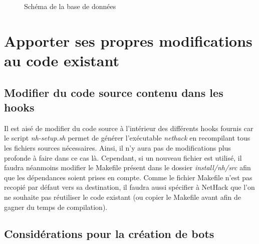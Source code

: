 \documentclass[10pt,a4paper]{report}
\begin{document}
\begin{figure}[H]
	\caption{\label{fig:database} Schéma de la base de données}
\end{figure}

\chapter{Apporter ses propres modifications au code existant}
\section{Modifier du code source contenu dans les hooks}
Il est aisé de modifier du code source à l'intérieur des différents hooks
fournis car le script \emph{nh-setup.sh} permet de générer l'exécutable
\emph{nethack} en recompilant tous les fichiers sources nécessaires. Ainsi, il n'y aura
pas de modifications plus profonde à faire dans ce cas là. Cependant, si un
nouveau fichier est utilisé, il faudra néanmoins modifier le Makefile présent
dans le dossier \emph{install/nh/src} afin que les dépendances soient prises en
compte. Comme le fichier Makefile n'est pas recopié par défaut vers sa
destination, il faudra aussi spécifier à NetHack que l'on ne souhaite pas
réutiliser le code existant (ou copier le Makefile avant afin de gagner du temps
de compilation).


\section{Considérations pour la création de bots} \label{sec:creer-bot}
\end{document}
